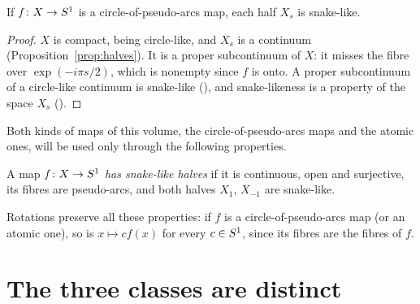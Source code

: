 
\begin{proposition}\label{prop:halves-snake}
If $f\colon X\to S^1$ is a circle-of-pseudo-arcs map, each half $X_s$ is snake-like.
\end{proposition}

\begin{proof}
$X$ is compact, being circle-like, and $X_s$ is a continuum (Proposition~\ref{prop:halves}). It is a proper subcontinuum of $X$: it misses the fibre over
$\exp(-i\pi s/2)$, which is nonempty since $f$ is onto. A proper subcontinuum of a circle-like continuum is snake-like (), and
snake-likeness is a property of the space $X_s$ ().
\end{proof}


Both kinds of maps of this volume, the circle-of-pseudo-arcs maps and the atomic ones, will be used only through the following properties.

\begin{definition}\label{def:snake-halves}
A map $f\colon X\to S^1$ \emph{has snake-like halves} if it is continuous, open and surjective, its fibres are pseudo-arcs, and both halves $X_1$, $X_{-1}$
are snake-like.
\end{definition}


Rotations preserve all these properties: if $f$ is a circle-of-pseudo-arcs map (or an atomic one), so is $x\mapsto cf(x)$ for every $c\in S^1$, since its
fibres are the fibres of $f$.


\section{The three classes are distinct}

